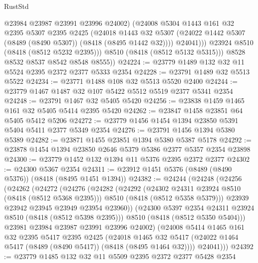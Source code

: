 \begin{lexlean}{RustStd}
\begin{coremodule}
                  @23984
                  @23987
                  @23991
                  @23996
                  @24002)
                (@24008
                  @5304
                  @1443
                  @161
                  @32
                  @2395
                  @5307
                  @2395
                  @2425
                  (@24018
                    @1443
                    @32
                    @5307
                    (@24022 @1442 @5307 (@8489 (@8490 @5307)) (@8418 (@8495 @1442 @32))))
                  @24041)))
            @23924
            @8510
            (@8418 (@8512 @5232 @2395)))
          @8510
          (@8418 (@8512 @5132 @5315)))
        @8528
        @8532
        @8537
        @8542
        @8548
        @8555))
@24224 := @23779 @1489 @132 @32 @11 @5524 @2395 @2372 @2377 @5333 @2354
@24228 := @23791 @1489 @32 @5513 @5522
@24234 := @23771 @1488 @108 @32 @5513 @5520 @2400
@24244 := @23779 @1467 @1487 @32 @107 @5422 @5512 @5519 @2377 @5341 @2354
@24248 := @23791 @1467 @32 @5405 @5420
@24256 := @23838 @1459 @1465 @161 @32 @5405 @5414 @2395 @5420
@24262 := @23847 @1458 @23851 @64 @5405 @5412 @5206
@24272 := @23779 @1456 @1454 @1394 @23850 @5391 @5404 @5411 @2377 @5349 @2354
@24276 := @23791 @1456 @1394 @5380 @5389
@24282 := @23871 @1455 @23851 @1394 @5380 @5387 @5178
@24292 := @23878 @1454 @1394 @23850 @2646 @5379 @5386 @2377 @5357 @2354 @23898
@24300 := @23779 @1452 @132 @1394 @11 @5376 @2395 @2372 @2377
@24302 := @24300 @5367 @2354
@24311 := @23912 @1451 @5376 (@8489 (@8490 @5376)) (@8418 (@8495 @1451 @1394))
@24382 := @24244
    (@24248
      (@24256
        (@24262
          (@24272
            (@24276
              (@24282
                (@24292
                  (@24302 @24311 @23924 @8510 (@8418 (@8512 @5368 @2395)))
                  @8510
                  (@8418 (@8512 @5358 @5379)))
                @23939
                @23942
                @23945
                @23949
                @23954
                @23960))
            (@24300 @5397 @2354 @24311 @23924 @8510 (@8418 (@8512 @5398 @2395)))
            @8510
            (@8418 (@8512 @5350 @5404)))
          @23981
          @23984
          @23987
          @23991
          @23996
          @24002)
        (@24008
          @5414
          @1465
          @161
          @32
          @2395
          @5417
          @2395
          @2425
          (@24018
            @1465
            @32
            @5417
            (@24022 @1464 @5417 (@8489 (@8490 @5417)) (@8418 (@8495 @1464 @32))))
          @24041)))
@24392 := @23779 @1485 @132 @32 @11 @5509 @2395 @2372 @2377 @5428 @2354

\end{coremodule}
\end{lexlean}

